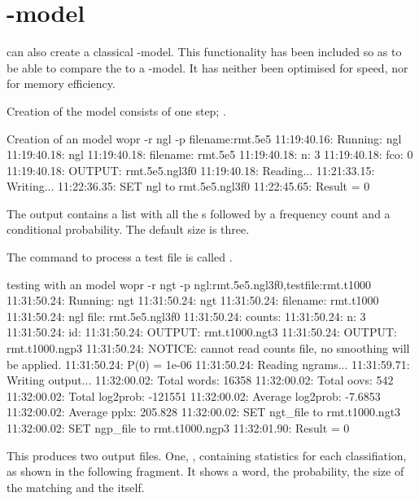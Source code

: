 \documentclass[a4paper,10pt,twoside]{report}
\begin{document}
\section{\ngram{}-model}

\Wopr{} can also create a classical \ngram{}-model. This functionality
has been included so as to be able to compare the \mb{} \lm{} to a 
 \ngram{}-model. It has neither been optimised for speed,
nor for memory efficiency.

Creation of the model consists of one step; .

\begin{bash}{Creation of an \ngram{} model}
wopr -r ngl -p filename:rmt.5e5
11:19:40.16: Running: ngl
11:19:40.18: ngl
11:19:40.18:  filename:  rmt.5e5
11:19:40.18:  n:         3
11:19:40.18:  fco:       0
11:19:40.18:  OUTPUT:    rmt.5e5.ngl3f0
11:19:40.18: Reading...
11:21:33.15: Writing...
11:22:36.35: SET ngl to rmt.5e5.ngl3f0
11:22:45.65: Result = 0
\end{bash}

The output contains a list with all the \ngram{}s followed by a
frequency count and a conditional probability. The default \ngram{}
size is three.

The command to process a test file is called .

\begin{bash}{testing with an \ngram{} model}
wopr -r ngt -p ngl:rmt.5e5.ngl3f0,testfile:rmt.t1000
11:31:50.24: Running: ngt
11:31:50.24: ngt
11:31:50.24:  filename:  rmt.t1000
11:31:50.24:  ngl file:  rmt.5e5.ngl3f0
11:31:50.24:  counts:    
11:31:50.24:  n:         3
11:31:50.24:  id:        
11:31:50.24:  OUTPUT:    rmt.t1000.ngt3
11:31:50.24:  OUTPUT:    rmt.t1000.ngp3
11:31:50.24: NOTICE: cannot read counts file, no smoothing will be applied.
11:31:50.24: P(0) = 1e-06
11:31:50.24: Reading ngrams...
11:31:59.71: Writing output...
11:32:00.02: Total words: 16358
11:32:00.02: Total oovs: 542
11:32:00.02: Total log2prob: -121551
11:32:00.02: Average log2prob: -7.6853
11:32:00.02: Average pplx: 205.828
11:32:00.02: SET ngt_file to rmt.t1000.ngt3
11:32:00.02: SET ngp_file to rmt.t1000.ngp3
11:32:01.90: Result = 0
\end{bash}

This produces two output files. One, , containing
statistics for each classifiation, as shown in the following fragment. It
shows a word, the \ngram{} probability, the size of the matching
\ngram{} and the \ngram{} itself.
\end{document}
